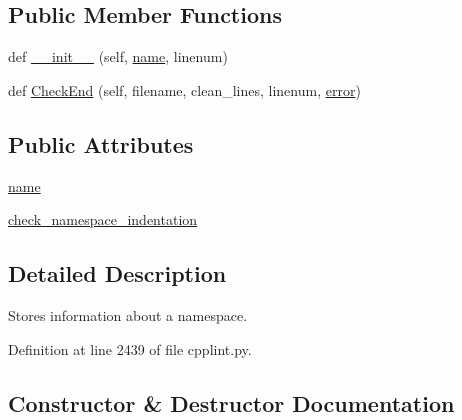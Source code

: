 \subsection*{Public Member Functions}
\begin{DoxyCompactItemize}
\item 
def \hyperlink{classcpplint_1_1___namespace_info_a4425c93bd90fbf869dc31c87302f5bb0}{\+\_\+\+\_\+init\+\_\+\+\_\+} (self, \hyperlink{classcpplint_1_1___namespace_info_a6b518dae822e4e440405654e83dc86a1}{name}, linenum)
\item 
def \hyperlink{classcpplint_1_1___namespace_info_a9d3abaeed0353942ca689eeeb2f2924b}{Check\+End} (self, filename, clean\+\_\+lines, linenum, \hyperlink{_07copy_08_2_read_camera_model_8m_ac546fdc9911f4a876dbfaffbc7426f8b}{error})
\end{DoxyCompactItemize}
\subsection*{Public Attributes}
\begin{DoxyCompactItemize}
\item 
\hyperlink{classcpplint_1_1___namespace_info_a6b518dae822e4e440405654e83dc86a1}{name}
\item 
\hyperlink{classcpplint_1_1___namespace_info_ae0b0b6ffafd3336a93cddca1078df268}{check\+\_\+namespace\+\_\+indentation}
\end{DoxyCompactItemize}


\subsection{Detailed Description}
\begin{DoxyVerb}Stores information about a namespace.\end{DoxyVerb}
 

Definition at line 2439 of file cpplint.\+py.



\subsection{Constructor \& Destructor Documentation}
